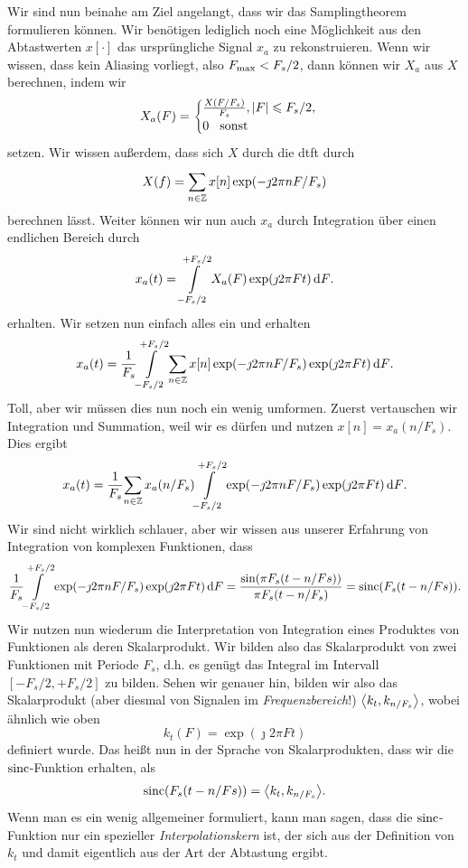 Wir sind nun beinahe am Ziel angelangt, dass wir das Samplingtheorem formulieren können.
Wir benötigen lediglich noch eine Möglichkeit aus den Abtastwerten $x[\cdot]$ das ursprüngliche Signal $x_a$ zu rekonstruieren.
Wenn wir wissen, dass kein Aliasing vorliegt, also $F_{\rm max} < F_s/2$, dann können wir $X_a$ aus $X$ berechnen, indem wir
\[
X_a(F) = \begin{cases}
    \frac{X(F/{F_s})}{F_s}, {\left| F \right|} \leqslant F_s/2, \\
    0 {\hspace{3mm} \text{sonst} \hspace{3mm}}
\end{cases}
\]
setzen.
Wir wissen außerdem, dass sich $X$ durch die \gls{dtft} durch
\[
    X(f) = {\sum\limits_{n \in \mathbb{Z}}^{}{
        x[n] \exp(-\jmath 2 \pi n F/F_s)
    }}
\]
berechnen lässt.
Weiter können wir nun auch $x_a$ durch Integration über einen endlichen Bereich durch
\[
    x_a(t) = {\int\limits_{-F_s/2}^{+F_s/2}{X_a(F) \exp(\jmath 2 \pi F t)}\,\mathrm{d}{F}}.
\]
erhalten. 
Wir setzen nun einfach alles ein und erhalten
\[
x_a(t) = \frac{1}{F_s}{\int\limits_{-F_s/2}^{+F_s/2}{
    {\sum\limits_{n \in \mathbb{Z}}^{}{
        x[n] \exp(-\jmath 2 \pi n F/F_s)
    }} 
    \exp(\jmath 2 \pi F t)}\,\mathrm{d}{F}}.
\]
Toll, aber wir müssen dies nun noch ein wenig umformen. Zuerst vertauschen wir Integration und Summation, weil wir es dürfen und nutzen $x[n] = x_a(n/F_s)$. Dies ergibt
\[
x_a(t) = \frac{1}{F_s}{\sum\limits_{n \in \mathbb{Z}}^{}{
            x_a(n/F_s)
            {\int\limits_{-F_s/2}^{+F_s/2}{
                \exp(-\jmath 2 \pi n F/F_s)
                \exp(\jmath 2 \pi F t)
            }\,\mathrm{d}{F}}
        }}.
\]
Wir sind nicht wirklich schlauer, aber wir wissen aus unserer Erfahrung von Integration von komplexen Funktionen, dass
\[
    \frac{1}{F_s}{\int\limits_{-F_s/2}^{+F_s/2}{
        \exp(-\jmath 2 \pi n F/F_s)
        \exp(\jmath 2 \pi F t)
    }\,\mathrm{d}{F}} = \frac{\sin(\pi F_s (t - n/Fs))}{\pi F_s (t - n/F_s)} = \operatorname*{sinc}(F_s (t - n/Fs)).
\]
Wir nutzen nun wiederum die Interpretation von Integration eines Produktes von Funktionen als deren Skalarprodukt.
Wir bilden also das Skalarprodukt von zwei Funktionen mit Periode $F_s$, d.h. es genügt das Integral im Intervall $[-F_s/2, +F_s/2]$ zu bilden.
Sehen wir genauer hin, bilden wir also das Skalarprodukt (aber diesmal von Signalen im \emph{Frequenzbereich}!) ${\left\langle k_t,k_{n/F_s} \right\rangle}$, wobei ähnlich wie oben
\[
k_t(F) = \exp(\jmath 2 \pi F t)
\]
definiert wurde.
Das heißt nun in der Sprache von Skalarprodukten, dass wir die $\operatorname*{sinc}$-Funktion erhalten, als
\[
    \operatorname*{sinc}(F_s (t - n/Fs)) = {\left\langle k_t,k_{n/F_s} \right\rangle}.
\]
Wenn man es ein wenig allgemeiner formuliert, kann man sagen, dass die $\operatorname*{sinc}$-Funktion nur ein spezieller \emph{Interpolationskern} ist, der sich aus der Definition von $k_t$ und damit eigentlich aus der Art der Abtastung ergibt.
